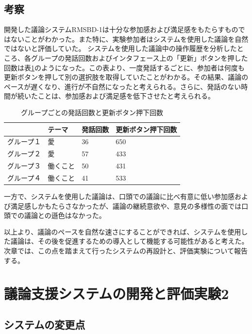 \documentclass[11pt, a4paper]{jreport} %
\begin{document}
\section{考察}
開発した議論システムRMSBD-1は十分な参加感および満足感をもたらすものではないことがわかった。また特に、実験参加者はシステムを使用した議論を自然ではないと評価していた。
システムを使用した議論中の操作履歴を分析したところ、各グループの発話回数およびインタフェース上の「更新」ボタンを押した回数は表\ref{tab:jikken1_log}のようになった。この表より、一度発話するごとに、参加者は何度も更新ボタンを押して別の選択肢を取得していたことがわかる。その結果、議論のペースが遅くなり、進行が不自然になったと考えられる。さらに、発話のない時間が続いたことは、参加感および満足感を低下させたと考えられる。

\begin{table}[]
\centering
\caption{グループごとの発話回数と更新ボタン押下回数}
\label{tab:jikken1_log}
\begin{tabular}{@{}llll@{}}
\toprule
\multicolumn{1}{c}{} & テーマ  & 発話回数 & 更新ボタン押下回数 \\ \midrule
グループ１                & 愛    & 36   & 650       \\
グループ２                & 愛    & 57   & 433       \\
グループ３                & 働くこと & 50   & 431       \\
グループ４                & 働くこと & 41   & 533       \\ \bottomrule
\end{tabular}
\end{table}


一方で、システムを使用した議論は、口頭での議論に比べ有意に低い参加感および満足感しかもたらさなかったが、議論の継続意欲や、意見の多様性の面では口頭での議論との遜色はなかった。


以上より、議論のペースを自然な速さにすることができれば、システムを使用した議論は、その後を促進するための導入として機能する可能性があると考えた。次章では、この点を踏まえて行ったシステムの再設計と、評価実験について報告する。





\chapter{議論支援システムの開発と評価実験2}

\section{システムの変更点}
\end{document}
